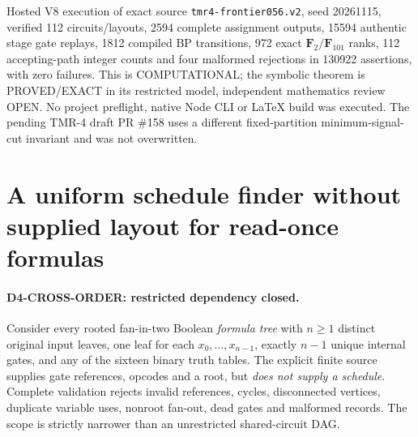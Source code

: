 \documentclass[11pt]{article}
\begin{document}
Hosted V8 execution of exact source \texttt{tmr4-frontier056.v2}, seed 20261115, verified 112 circuits/layouts, 2594 complete assignment outputs, 15594 authentic stage gate replays, 1812 compiled BP transitions, 972 exact $\mathbf F_2/\mathbf F_{101}$ ranks, 112 accepting-path integer counts and four malformed rejections in 130922 assertions, with zero failures. This is COMPUTATIONAL; the symbolic theorem is PROVED/EXACT in its restricted model, independent mathematics review OPEN. No project preflight, native Node CLI or LaTeX build was executed. The pending TMR-4 draft PR \#158 uses a different fixed-partition minimum-signal-cut invariant and was not overwritten.


\section{A uniform schedule finder without supplied layout for read-once formulas}
\paragraph{D4-CROSS-ORDER: restricted dependency closed.}
Consider every rooted fan-in-two Boolean \emph{formula tree} with $n\ge1$ distinct original input leaves, one leaf for each $x_0,\ldots,x_{n-1}$, exactly $n-1$ unique internal gates, and any of the sixteen binary truth tables. The explicit finite source supplies gate references, opcodes and a root, but \emph{does not supply a schedule}. Complete validation rejects invalid references, cycles, disconnected vertices, duplicate variable uses, nonroot fan-out, dead gates and malformed records. The scope is strictly narrower than an unrestricted shared-circuit DAG.
\end{document}
